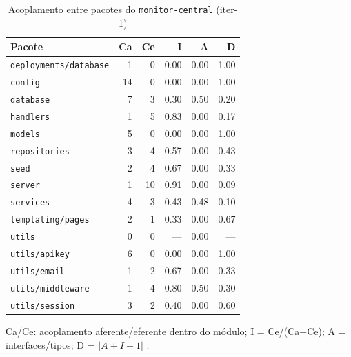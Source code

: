 \begin{table}[htbp]
  \centering\small
  \caption{Acoplamento entre pacotes do \texttt{monitor-central} (iter-1)}
  \label{tab:iter-1-acoplamento-central}
  \begin{tabular}{lrrrrr}
    \toprule
    Pacote & Ca & Ce & I & A & D \\
    \midrule
    \texttt{deployments/database} & 1 & 0 & 0.00 & 0.00 & 1.00 \\
    \texttt{config} & 14 & 0 & 0.00 & 0.00 & 1.00 \\
    \texttt{database} & 7 & 3 & 0.30 & 0.50 & 0.20 \\
    \texttt{handlers} & 1 & 5 & 0.83 & 0.00 & 0.17 \\
    \texttt{models} & 5 & 0 & 0.00 & 0.00 & 1.00 \\
    \texttt{repositories} & 3 & 4 & 0.57 & 0.00 & 0.43 \\
    \texttt{seed} & 2 & 4 & 0.67 & 0.00 & 0.33 \\
    \texttt{server} & 1 & 10 & 0.91 & 0.00 & 0.09 \\
    \texttt{services} & 4 & 3 & 0.43 & 0.48 & 0.10 \\
    \texttt{templating/pages} & 2 & 1 & 0.33 & 0.00 & 0.67 \\
    \texttt{utils} & 0 & 0 & --- & 0.00 & --- \\
    \texttt{utils/apikey} & 6 & 0 & 0.00 & 0.00 & 1.00 \\
    \texttt{utils/email} & 1 & 2 & 0.67 & 0.00 & 0.33 \\
    \texttt{utils/middleware} & 1 & 4 & 0.80 & 0.50 & 0.30 \\
    \texttt{utils/session} & 3 & 2 & 0.40 & 0.00 & 0.60 \\
    \bottomrule
  \end{tabular}
  \par\smallskip\footnotesize Ca/Ce: acoplamento aferente/eferente dentro do módulo; I = Ce/(Ca+Ce); A = interfaces/tipos; D = $|A+I-1|$ \cite{martin2002}.
\end{table}


